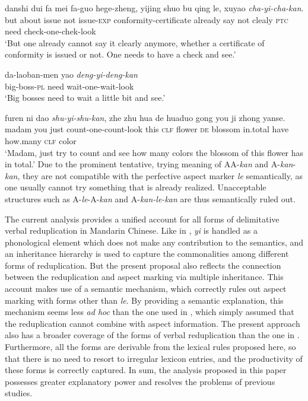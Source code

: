 \documentclass[11pt,a4paper,fleqn,draft]{article}
\let\textbf\emph
\begin{document}
\ea\label{ex:AyiAkan}
  \ea
  \gll danshi dui fa mei fa-guo hege-zheng, yijing shuo bu qing le, xuyao \textbf{cha-yi-cha-kan}.\\
  but about issue not issue-\textsc{exp} conformity-certificate already say not clealy \textsc{ptc} need check-one-chek-look\\ 
  \glt `But one already cannot say it clearly anymore, whether a certificate of conformity is issued or not. One needs to have a check and see.'
  
  \ex
  \gll da-laoban-men yao \textbf{deng-yi-deng-kan}\\
  big-boss-\textsc{pl} need wait-one-wait-look\\ 
  \glt `Big bosses need to wait a little bit and see.'
  
  \ex
  \gll furen ni dao \textbf{shu-yi-shu-kan}, zhe zhu hua de huaduo gong you ji zhong yanse.\\
  madam you just count-one-count-look this \textsc{clf} flower \textsc{de} blossom in.total have how.many \textsc{clf} color\\ 
  \glt `Madam, just try to count and see how many colors the blossom of this flower has in total.'
  \z
\z
Due to the prominent tentative, trying meaning of AA-\emph{kan} and A-\emph{kan}-\emph{kan}, they are not compatible with the perfective aspect marker \emph{le} semantically,
as one usually cannot try something that is already realized.
Unacceptable structures such as  A\hyp{}\emph{le}\hyp{}A\hyp{}\emph{kan} and A\hyp{}\emph{kan\hyp{}le\hyp{}kan} are thus semantically ruled out.

The current analysis provides a unified account for all forms of delimitative verbal reduplication in Mandarin Chinese.
Like in \citet{FanSongBond2015}, \emph{yi} is handled as a phonological element which does not make any contribution to the semantics,
 and an inheritance hierarchy is used to capture the commonalities among different forms of reduplication.
But the present proposal also reflects the connection between the reduplication and aspect marking via multiple inheritance.
This account makes use of a semantic mechanism, which correctly rules out aspect marking with forms other than \emph{le}.
By providing a semantic explanation, this mechanism seems less \emph{ad hoc} than the one used in \citet{FanSongBond2015}, which simply assumed that the reduplication cannot combine with aspect information.
The present approach also has a broader coverage of the forms of verbal reduplication than the one in \citet{FanSongBond2015}.
Furthermore, all the forms are derivable from the lexical rules proposed here, so that there is no need to resort to irregular lexicon entries, and the productivity of these forms is correctly captured.
In sum, the analysis proposed in this paper possesses greater explanatory power and resolves the problems of previous studies.
\end{document}
